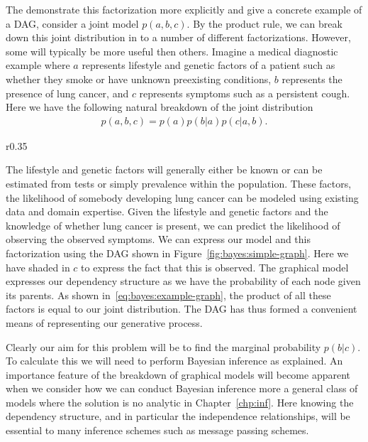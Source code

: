 The demonstrate this factorization more explicitly and give a concrete example of a DAG, consider a joint model
$p(a,b,c)$.  By the product rule, we can break down this joint distribution in to a number of different
factorizations.  However, some will typically be more useful then others.  Imagine a medical diagnostic
example where $a$ represents lifestyle and genetic factors of a patient such as whether they smoke
or have unknown preexisting conditions, 
$b$ represents the presence of lung cancer, and $c$ represents symptoms 
such as a persistent cough.  Here we have the following natural breakdown of the joint distribution
\begin{align}
\label{eq:bayes:example-graph}
p(a,b,c) = p(a) p(b|a) p(c|a,b).
\end{align}
\begin{wrapfigure}{r}{0.35\textwidth}
	\vspace{-12pt}
	\centering 
	\resizebox{.32\textwidth}{!}{
		
	}
	\caption{Simple example DAG corresponding to~\eqref{eq:bayes:example-graph}
		\label{fig:bayes:simple-graph}}
	\vspace{-10pt}
\end{wrapfigure}
The lifestyle and genetic factors will generally either be known or can be estimated from tests or
simply prevalence within the population.  These factors, the likelihood of somebody developing
lung cancer can be modeled using existing data and domain expertise.   Given the lifestyle and
genetic factors and the knowledge of whether lung cancer is present, we can predict the likelihood
of observing the observed symptoms.  We can express our model and this factorization using
the DAG shown in Figure~\ref{fig:bayes:simple-graph}.
  Here we have shaded in $c$ to express the fact that this is
observed.  The graphical model expresses our dependency structure as we have the probability
of each node given its parents.  As shown in~\eqref{eq:bayes:example-graph}, the product of
all these factors is equal to our joint distribution.  The DAG has thus formed a convenient means
of representing our generative process.

Clearly our aim for this problem will be to find the marginal probability $p(b|c)$.  To calculate this
we will need to perform Bayesian inference as explained.
An importance feature of the breakdown of graphical models will become apparent when we
consider how we can conduct Bayesian inference more a general class of 
models where the solution is no analytic in Chapter~\ref{chp:inf}.  Here knowing the dependency
structure, and in particular the independence relationships, will be essential to many inference 
schemes such as message passing schemes.

